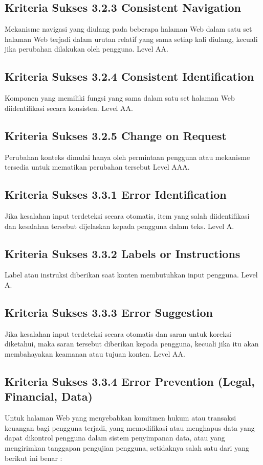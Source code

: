 \subsection{Kriteria Sukses 3.2.3 Consistent Navigation}
\label{sec:kriteria_3.2.3}
Mekanisme navigasi yang diulang pada beberapa halaman Web dalam satu set halaman Web terjadi dalam urutan relatif yang sama setiap kali diulang, kecuali jika perubahan dilakukan oleh pengguna.
Level AA.

\subsection{Kriteria Sukses 3.2.4 Consistent Identification}
\label{sec:kriteria_3.2.4}
Komponen yang memiliki fungsi yang sama dalam satu set halaman Web diidentifikasi secara konsisten.
Level AA.

\subsection{Kriteria Sukses 3.2.5 Change on Request}
\label{sec:kriteria_3.2.5}
Perubahan konteks dimulai hanya oleh permintaan pengguna atau mekanisme tersedia untuk mematikan perubahan tersebut
Level AAA.

\subsection{Kriteria Sukses 3.3.1 Error Identification}
\label{sec:kriteria_3.3.1}
Jika kesalahan input terdeteksi secara otomatis, item yang salah diidentifikasi dan kesalahan tersebut dijelaskan kepada pengguna dalam teks.
Level A.

\subsection{Kriteria Sukses 3.3.2 Labels or Instructions}
\label{sec:kriteria_3.3.2}
Label atau instruksi diberikan saat konten membutuhkan input pengguna.
Level A.

\subsection{Kriteria Sukses 3.3.3 Error Suggestion}
\label{sec:kriteria_3.3.3}
Jika kesalahan input terdeteksi secara otomatis dan saran untuk koreksi diketahui, maka saran tersebut diberikan kepada pengguna, kecuali jika itu akan membahayakan keamanan atau tujuan konten.
Level AA.

\subsection{Kriteria Sukses 3.3.4 Error Prevention (Legal, Financial, Data)}
\label{sec:kriteria_3.3.4}
Untuk halaman Web yang menyebabkan komitmen hukum atau transaksi keuangan bagi pengguna terjadi, yang memodifikasi atau menghapus data yang dapat dikontrol pengguna dalam sistem penyimpanan data, atau yang mengirimkan tanggapan pengujian pengguna, setidaknya salah satu dari yang berikut ini benar :

